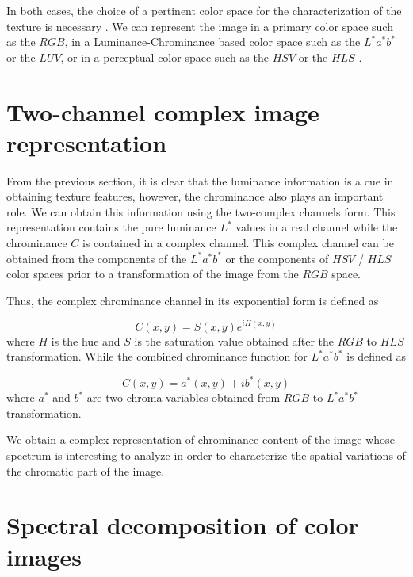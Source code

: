
In both cases, the choice of a pertinent color space for the characterization of the texture is necessary \citep{Qazi.Alata.ea:PR:2011}. We can represent the image in a primary color space such as the $RGB$, in a Luminance-Chrominance based color space such as the $L^*a^*b^*$ or the $LUV$, or in a perceptual color space such as the $HSV$ or the $HLS$ \citep{Hanbury:IA:2003}. 





\section{Two-channel complex image representation}

From the previous section, it is clear that the luminance information is a cue in obtaining texture features, however, the chrominance also plays an important role. We can obtain this information using the two-complex channels form. This representation contains the pure luminance $L^*$ values in a real channel while the chrominance $C$ is contained in a complex channel. This complex channel can be obtained from the components of the $L^*a^*b^*$ or the components of $HSV$ / $HLS$ color spaces prior to a transformation of the image from the $RGB$ space.

Thus, the complex chrominance channel in its exponential form is defined as  

\begin{equation}\label{eq:chrominance_hsv}
    C(x,y) = S(x,y) e^{iH(x,y)}
\end{equation}
where $H$ is the hue and $S$ is the saturation value obtained after the $RGB$ to $HLS$ transformation. While the combined chrominance function for $L^*a^*b^*$ is defined as

\begin{equation}\label{eq:chrominance_lab}
    C(x,y) = a^*(x,y) + ib^*(x,y)
\end{equation}
where $a^*$ and $b^*$ are two chroma variables obtained from $RGB$ to $L^*a^*b^*$ transformation. 

We obtain a complex representation of chrominance content of the image whose spectrum is interesting to analyze in order to characterize the spatial variations of the chromatic part of the image. 

\section{Spectral decomposition of color images}

